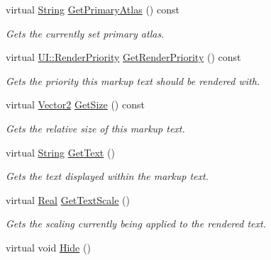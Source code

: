 \begin{DoxyCompactItemize}
virtual \hyperlink{namespaceMezzanine_acf9fcc130e6ebf08e3d8491aebcf1c86}{String} \hyperlink{classMezzanine_1_1UI_1_1MarkupText_afdb2415e459de43341b7dad687d2ae31}{GetPrimaryAtlas} () const 
\begin{DoxyCompactList}\small\item\em Gets the currently set primary atlas. \item\end{DoxyCompactList}\item 
virtual \hyperlink{namespaceMezzanine_1_1UI_ac4c753eb6b5d66350a243acc9ce54130}{UI::RenderPriority} \hyperlink{classMezzanine_1_1UI_1_1MarkupText_aaf0e1e55d5293f58b03c97d93ecffd9f}{GetRenderPriority} () const 
\begin{DoxyCompactList}\small\item\em Gets the priority this markup text should be rendered with. \item\end{DoxyCompactList}\item 
virtual \hyperlink{classMezzanine_1_1Vector2}{Vector2} \hyperlink{classMezzanine_1_1UI_1_1MarkupText_aac482cb90a223c4346103a8012c892c4}{GetSize} () const 
\begin{DoxyCompactList}\small\item\em Gets the relative size of this markup text. \item\end{DoxyCompactList}\item 
virtual \hyperlink{namespaceMezzanine_acf9fcc130e6ebf08e3d8491aebcf1c86}{String} \hyperlink{classMezzanine_1_1UI_1_1MarkupText_ae04d70b952a2816e429b756b8d4f4ded}{GetText} ()
\begin{DoxyCompactList}\small\item\em Gets the text displayed within the markup text. \item\end{DoxyCompactList}\item 
virtual \hyperlink{namespaceMezzanine_a726731b1a7df72bf3583e4a97282c6f6}{Real} \hyperlink{classMezzanine_1_1UI_1_1MarkupText_a0d8c33512d2b434fd9f1a4f22cb76320}{GetTextScale} ()
\begin{DoxyCompactList}\small\item\em Gets the scaling currently being applied to the rendered text. \item\end{DoxyCompactList}\item 
\hypertarget{classMezzanine_1_1UI_1_1MarkupText_a8dc4cd380e73e74b686fd367db5c40cb}{
virtual void \hyperlink{classMezzanine_1_1UI_1_1MarkupText_a8dc4cd380e73e74b686fd367db5c40cb}{Hide} ()}
\label{classMezzanine_1_1UI_1_1MarkupText_a8dc4cd380e73e74b686fd367db5c40cb}


\end{DoxyCompactItemize}
